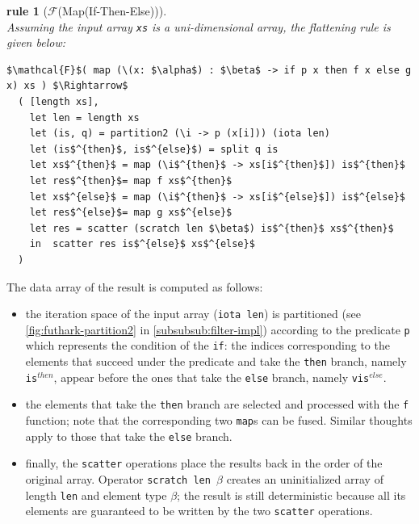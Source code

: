 \documentclass[acmsmall,review]{acmart}\settopmatter{printfolios=true,printccs=false,printacmref=false}
\newtheorem{rewrite}{rule}
\begin{document}
\begin{rewrite}[$\mathcal{F}$(Map(If-Then-Else))]\label{Flat-If-In-Map}
$\mbox{ }$\\
Assuming the input array {\tt xs} is a uni-dimensional array, the 
flattening rule is given below:
\begin{lstlisting}[mathescape=true]
$\mathcal{F}$( map (\(x: $\alpha$) : $\beta$ -> if p x then f x else g x) xs ) $\Rightarrow$
  ( [length xs],
    let len = length xs
    let (is, q) = partition2 (\i -> p (x[i])) (iota len)
    let (is$^{then}$, is$^{else}$) = split q is
    let xs$^{then}$ = map (\i$^{then}$ -> xs[i$^{then}$]) is$^{then}$
    let res$^{then}$= map f xs$^{then}$
    let xs$^{else}$ = map (\i$^{then}$ -> xs[i$^{else}$]) is$^{else}$    
    let res$^{else}$= map g xs$^{else}$
    let res = scatter (scratch len $\beta$) is$^{then}$ xs$^{then}$
    in  scatter res is$^{else}$ xs$^{else}$
  )
\end{lstlisting}\vspace{-2ex}
\end{rewrite}

The data array of the result is computed as follows:
\begin{itemize}
    \item the iteration space of the input array (\lstinline{iota len}) 
            is partitioned 
            (see \cref{fig:futhark-partition2} in \cref{subsubsub:filter-impl}) 
            according to the predicate {\tt p} which represents the 
            condition of the \lstinline{if}: the indices corresponding
            to the elements that succeed under the predicate and take the
            \lstinline{then} branch, namely {\tt is$^{then}$}, 
            appear before the ones that take the \lstinline{else}
            branch, namely {\tt vis$^{else}$}.
    \item the elements that take the \lstinline{then} branch are
            selected and processed with the {\tt f} function; note that
            the corresponding two \lstinline{map}s can be fused.
          Similar thoughts apply to those that take the \lstinline{else}
            branch.
    \item finally, the \lstinline{scatter} operations place the results
            back in the order of the original array. Operator 
            {\tt scratch len $\beta$} creates an uninitialized array of 
            length {\tt len} and element type $\beta$; the result is still 
            deterministic because 
            all its elements are guaranteed to be written by the two 
            \lstinline{scatter} operations.
\end{itemize}
 
\end{document}
